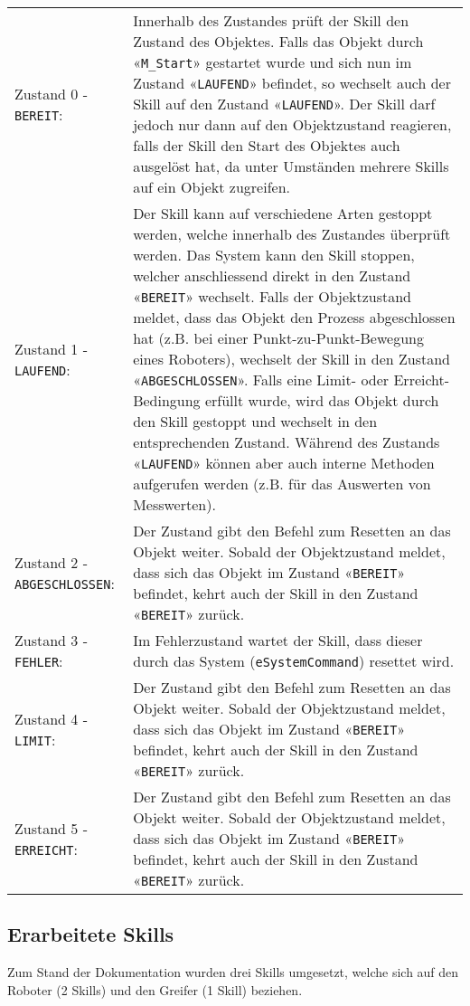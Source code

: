 		\begin{tabularx}{\textwidth}{@{}>{}p{13em} X@{}}
			Zustand 0 - \verb|BEREIT|: & 
			Innerhalb des Zustandes prüft der Skill den Zustand des Objektes. Falls das Objekt durch «\verb|M_Start|» gestartet wurde und sich nun im Zustand «\verb|LAUFEND|» befindet, so wechselt auch der Skill auf den Zustand «\verb|LAUFEND|». Der Skill darf jedoch nur dann auf  den Objektzustand reagieren, falls der Skill den Start des Objektes auch ausgelöst hat, da unter Umständen mehrere Skills auf ein Objekt zugreifen. 
			\\
			Zustand 1 - \verb|LAUFEND|: & 
			Der Skill kann auf verschiedene Arten gestoppt werden, welche innerhalb des Zustandes überprüft werden. Das System kann den Skill stoppen, welcher anschliessend direkt in den Zustand «\verb|BEREIT|» wechselt. Falls der Objektzustand meldet, dass das Objekt den Prozess abgeschlossen hat (z.B. bei einer Punkt-zu-Punkt-Bewegung eines Roboters), wechselt der Skill in den Zustand «\verb|ABGESCHLOSSEN|». Falls eine Limit- oder Erreicht-Bedingung erfüllt wurde, wird das Objekt durch den Skill gestoppt und wechselt in den entsprechenden Zustand. Während des Zustands «\verb|LAUFEND|» können aber auch interne Methoden aufgerufen werden (z.B. für das Auswerten von Messwerten).
			\\
			Zustand 2 - \verb|ABGESCHLOSSEN|: & 
			Der Zustand gibt den Befehl zum Resetten an das Objekt weiter. Sobald der Objektzustand meldet, dass sich das Objekt im Zustand «\verb|BEREIT|» befindet, kehrt auch der Skill in den Zustand «\verb|BEREIT|» zurück. 
			\\
			Zustand 3 - \verb|FEHLER|: & 
			Im Fehlerzustand wartet der Skill, dass dieser durch das System (\verb|eSystemCommand|) resettet wird. 
			\\
			Zustand 4 - \verb|LIMIT|: & 
			Der Zustand gibt den Befehl zum Resetten an das Objekt weiter. Sobald der Objektzustand meldet, dass sich das Objekt im Zustand «\verb|BEREIT|» befindet, kehrt auch der Skill in den Zustand «\verb|BEREIT|» zurück.
			\\
			Zustand 5 - \verb|ERREICHT|: & 
			Der Zustand gibt den Befehl zum Resetten an das Objekt weiter. Sobald der Objektzustand meldet, dass sich das Objekt im Zustand «\verb|BEREIT|» befindet, kehrt auch der Skill in den Zustand «\verb|BEREIT|» zurück.
			\\
		\end{tabularx}
		
		\newpage
	
	\subsection{Erarbeitete Skills} \label{Skills_Erarbeitet}
		Zum Stand der Dokumentation wurden drei Skills umgesetzt, welche sich auf den Roboter (2 Skills) und den Greifer (1 Skill) beziehen. 	
		
